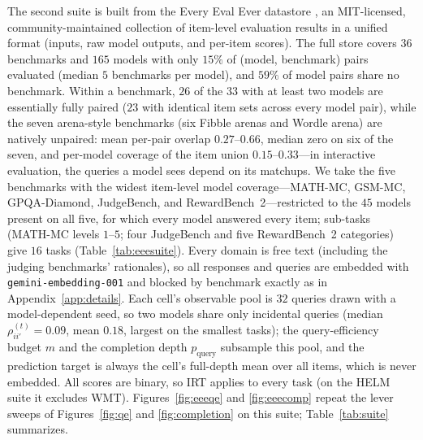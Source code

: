\documentclass{article}
\theoremstyle{definition}
\theoremstyle{remark}
\theoremstyle{plain}
\begin{document}
The second suite is built from the Every Eval Ever datastore \citep{eee2026}, an
MIT-licensed, community-maintained collection of item-level evaluation results in a
unified format (inputs, raw model outputs, and per-item scores). The full store
covers $36$ benchmarks and $165$ models with only $15\%$ of (model, benchmark)
pairs evaluated (median $5$ benchmarks per model), and $59\%$ of model pairs share
no benchmark. Within a benchmark, $26$ of the $33$ with at least two models are
essentially fully paired ($23$ with identical item sets across every model pair),
while the seven arena-style benchmarks (six Fibble arenas and Wordle arena) are
natively unpaired: mean per-pair overlap $0.27$--$0.66$, median zero on six of the
seven, and per-model coverage of the item union $0.15$--$0.33$---in interactive
evaluation, the queries a model sees depend on its matchups. We take the five benchmarks with the
widest item-level model coverage---MATH-MC, GSM-MC, GPQA-Diamond, JudgeBench, and
RewardBench~2---restricted to the $45$ models present on all five, for which every
model answered every item; sub-tasks (MATH-MC
levels $1$--$5$; four JudgeBench and five RewardBench~2 categories) give $16$ tasks
(Table~\ref{tab:eeesuite}). Every domain is free text (including the
judging benchmarks' rationales), so all responses and queries are embedded with
\texttt{gemini-embedding-001} and blocked by benchmark exactly as in
Appendix~\ref{app:details}. Each cell's observable pool is $32$ queries drawn with a
model-dependent seed, so two models share only incidental queries (median
$\rho_{ii'}^{(t)}=0.09$, mean $0.18$, largest on the smallest tasks); the
query-efficiency budget $m$ and the completion depth $p_{\mathrm{query}}$ subsample this
pool, and the prediction target is always the cell's full-depth mean over all items, which
is never embedded.
All scores are binary, so IRT applies to every task (on the HELM suite it excludes WMT).
Figures~\ref{fig:eeeqe} and \ref{fig:eeecomp} repeat the lever sweeps of
Figures~\ref{fig:qe} and \ref{fig:completion} on this suite; Table~\ref{tab:suite}
summarizes.
\end{document}
